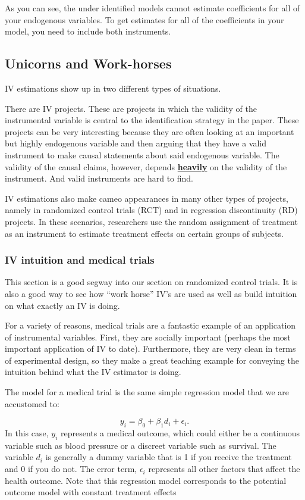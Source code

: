 \documentclass[
]{article}
\begin{document}
As you can see, the under identified models cannot estimate coefficients
for all of your endogenous variables. To get estimates for all of the
coefficients in your model, you need to include both instruments.

\subsection{Unicorns and Work-horses}

IV estimations show up in two different types of situations.

There are IV projects. These are projects in which the validity of the
instrumental variable is central to the identification strategy in the
paper. These projects can be very interesting because they are often
looking at an important but highly endogenous variable and then arguing
that they have a valid instrument to make causal statements about said
endogenous variable. The validity of the causal claims, however, depends
\textbf{\underline{heavily}} on the validity of the instrument. And
valid instruments are hard to find.

IV estimations also make cameo appearances in many other types of
projects, namely in randomized control trials (RCT) and in regression
discontinuity (RD) projects. In these scenarios, researchers use the
random assignment of treatment as an instrument to estimate treatment
effects on certain groups of subjects.

\subsubsection{IV intuition and medical trials}

This section is a good segway into our section on randomized control
trials. It is also a good way to see how ``work horse'' IV's are used as
well as build intuition on what exactly an IV is doing.

For a variety of reasons, medical trials are a fantastic example of an
application of instrumental variables. First, they are socially
important (perhaps the most important application of IV to date).
Furthermore, they are very clean in terms of experimental design, so
they make a great teaching example for conveying the intuition behind
what the IV estimator is doing.

The model for a medical trial is the same simple regression model that
we are accustomed to:

\[
y_i=\beta_0+\beta_1 d_i+\epsilon_i.
\] In this case, \(y_i\) represents a medical outcome, which could
either be a continuous variable such as blood pressure or a discreet
variable such as survival. The variable \(d_i\) is generally a dummy
variable that is 1 if you receive the treatment and 0 if you do not. The
error term, \(\epsilon_i\) represents all other factors that affect the
health outcome. Note that this regression model corresponds to the
potential outcome model with constant treatment effects
\end{document}
